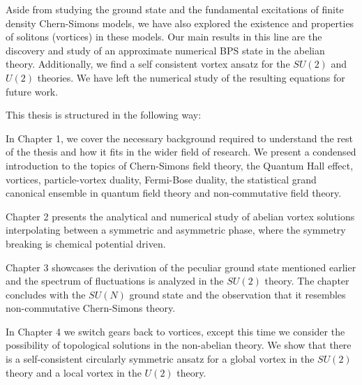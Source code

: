     Aside from studying the ground state and the fundamental excitations of finite density Chern-Simons models, we have also explored the existence and properties of solitons (vortices) in these models. Our main results in this line are the discovery and study of an approximate numerical BPS state in the abelian theory. Additionally, we find a self consistent vortex ansatz for the $SU(2)$ and $U(2)$ theories. We have left the numerical study of the resulting equations for future work.

    This thesis is structured in the following way:

    In Chapter 1, we cover the necessary background required to understand the rest of the thesis and how it fits in the wider field of research. We present a condensed introduction to the topics of Chern-Simons field theory, the Quantum Hall effect, vortices, particle-vortex duality, Fermi-Bose duality, the statistical grand canonical ensemble in quantum field theory and non-commutative field theory.

    Chapter 2 presents the analytical and numerical study of abelian vortex solutions interpolating between a symmetric and asymmetric phase, where the symmetry breaking is chemical potential driven.

    Chapter 3 showcases the derivation of the peculiar ground state mentioned earlier and the spectrum of fluctuations is analyzed in the $SU(2)$ theory. The chapter concludes with the $SU(N)$ ground state and the observation that it resembles non-commutative Chern-Simons theory.

    In Chapter 4 we switch gears back to vortices, except this time we consider the possibility of topological solutions in the non-abelian theory. We show that there is a self-consistent circularly symmetric ansatz for a global vortex in the $SU(2)$ theory and a local vortex in the $U(2)$ theory.



